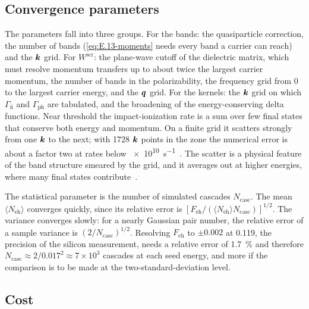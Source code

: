\subsection{Convergence parameters}

The parameters fall into three groups. For the bands: the quasiparticle correction, the number of bands (\cref{eq:E.13-moments} needs every band a carrier can reach) and the $\bm{k}$ grid. For $W^{\mathrm{scr}}$: the plane-wave cutoff of the dielectric matrix, which must resolve momentum transfers up to about twice the largest carrier momentum, the number of bands in the polarizability, the frequency grid from 0 to the largest carrier energy, and the $\bm{q}$ grid. For the kernels: the $\bm{k}$ grid on which $\varGamma_{\mathrm{ii}}$ and $\varGamma_{\mathrm{ph}}$ are tabulated, and the broadening of the energy-conserving delta functions. Near threshold the impact-ionization rate is a sum over few final states that conserve both energy and momentum. On a finite grid it scatters strongly from one $\bm{k}$ to the next; with 1728 $\bm{k}$ points in the zone the numerical error is about a factor two at rates below \SI{e10}{s^{-1}}~\cite[Fig.~2]{kotani2010impact}. The scatter is a physical feature of the band structure smeared by the grid, and it averages out at higher energies, where many final states contribute~\cite[Sect.~III]{kotani2010impact}.

The statistical parameter is the number of simulated cascades $N_{\mathrm{casc}}$. The mean $\langle N_{\mathrm{eh}}\rangle$ converges quickly, since its relative error is $[F_{\mathrm{eh}}/(\langle N_{\mathrm{eh}}\rangle N_{\mathrm{casc}})]^{1/2}$. The variance converges slowly: for a nearly Gaussian pair number, the relative error of a sample variance is $(2/N_{\mathrm{casc}})^{1/2}$. Resolving $F_{\mathrm{eh}}$ to $\pm0.002$ at 0.119, the precision of the silicon measurement, needs a relative error of \SI{1.7}{\percent} and therefore $N_{\mathrm{casc}} \approx 2/0.017^2 \approx 7\times10^3$ cascades at each seed energy, and more if the comparison is to be made at the two-standard-deviation level.

\subsection{Cost}

